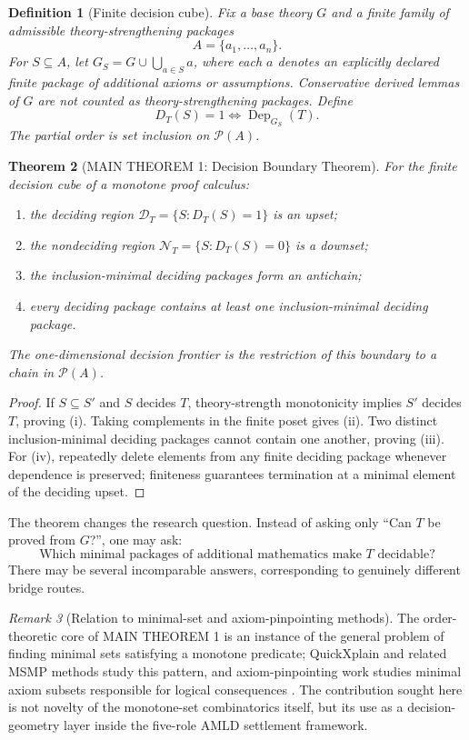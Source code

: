 \documentclass[11pt]{article}
\newtheorem{definition}{Definition}[section]
\newtheorem{theorem}[definition]{Theorem}
\theoremstyle{remark}
\newtheorem{remark}[definition]{Remark}
\newcommand{\Dep}{\operatorname{Dep}}
\newcommand{\Pow}{\mathcal P}
\begin{document}
\begin{definition}[Finite decision cube]
Fix a base theory $G$ and a finite family of admissible theory-strengthening packages
\[
A=\{a_1,\ldots,a_n\}.
\]
For $S\subseteq A$, let $G_S=G\cup\bigcup_{a\in S}a$, where each $a$ denotes an explicitly declared finite package of additional axioms or assumptions. Conservative derived lemmas of $G$ are not counted as theory-strengthening packages. Define
\[
D_T(S)=1\iff \Dep_{G_S}(T).
\]
The partial order is set inclusion on $\Pow(A)$.
\end{definition}

\begin{theorem}[MAIN THEOREM 1: Decision Boundary Theorem]
For the finite decision cube of a monotone proof calculus:
\begin{enumerate}[label=(\roman*)]
\item the deciding region $\mathcal D_T=\{S:D_T(S)=1\}$ is an upset;
\item the nondeciding region $\mathcal N_T=\{S:D_T(S)=0\}$ is a downset;
\item the inclusion-minimal deciding packages form an antichain;
\item every deciding package contains at least one inclusion-minimal deciding package.
\end{enumerate}
The one-dimensional decision frontier is the restriction of this boundary to a chain in $\Pow(A)$.
\end{theorem}

\begin{proof}
If $S\subseteq S'$ and $S$ decides $T$, theory-strength monotonicity implies $S'$ decides $T$, proving (i). Taking complements in the finite poset gives (ii). Two distinct inclusion-minimal deciding packages cannot contain one another, proving (iii). For (iv), repeatedly delete elements from any finite deciding package whenever dependence is preserved; finiteness guarantees termination at a minimal element of the deciding upset.
\end{proof}

The theorem changes the research question. Instead of asking only ``Can $T$ be proved from $G$?'', one may ask:
\[
\boxed{\text{Which minimal packages of additional mathematics make }T\text{ decidable?}}
\]
There may be several incomparable answers, corresponding to genuinely different bridge routes.

\begin{remark}[Relation to minimal-set and axiom-pinpointing methods]
The order-theoretic core of MAIN THEOREM 1 is an instance of the general problem of finding minimal sets satisfying a monotone predicate; QuickXplain and related MSMP methods study this pattern, and axiom-pinpointing work studies minimal axiom subsets responsible for logical consequences \cite{junker,rodler,baader}. The contribution sought here is not novelty of the monotone-set combinatorics itself, but its use as a decision-geometry layer inside the five-role AMLD settlement framework.
\end{remark}
\end{document}
